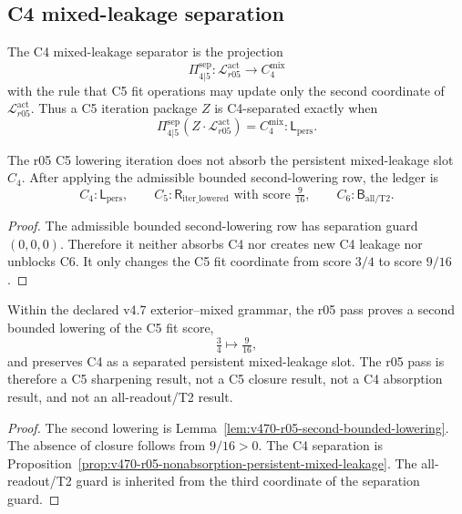 \subsection{C4 mixed-leakage separation}
\label{subsec:v470-r05-c4-mixed-leakage-separation}

\begin{definition}
\label{def:v470-r05-c4-leakage-separator}
The C4 mixed-leakage separator is the projection
\[
\Pi_{4|5}^{\mathrm{sep}}:
\mathcal L_{r05}^{\mathrm{act}}
\longrightarrow C_4^{\mathrm{mix}}
\]
with the rule that C5 fit operations may update only the second coordinate of
\(\mathcal L_{r05}^{\mathrm{act}}\).  Thus a C5 iteration package \(Z\) is
C4-separated exactly when
\[
\Pi_{4|5}^{\mathrm{sep}}(Z\cdot\mathcal L_{r05}^{\mathrm{act}})
=
C_4^{\mathrm{mix}}:\mathsf L_{\mathrm{pers}}.
\]
\end{definition}

\begin{proposition}
\label{prop:v470-r05-nonabsorption-persistent-mixed-leakage}
The r05 C5 lowering iteration does not absorb the persistent mixed-leakage slot
\(C_4\).  After applying the admissible bounded second-lowering row, the ledger
is
\[
C_4:\mathsf L_{\mathrm{pers}},
\qquad
C_5:\mathsf R_{\mathrm{iter\_lowered}}\text{ with score }\tfrac{9}{16},
\qquad
C_6:\mathsf B_{\mathrm{all/T2}}.
\]
\end{proposition}

\begin{proof}
The admissible bounded second-lowering row has separation guard \((0,0,0)\).
Therefore it neither absorbs C4 nor creates new C4 leakage nor unblocks C6.  It
only changes the C5 fit coordinate from score \(3/4\) to score \(9/16\).
\end{proof}

\begin{theorem}
\label{thm:v470-r05-conservative-c5-iteration-c4-separation}
Within the declared v4.7 exterior--mixed grammar, the r05 pass proves a second
bounded lowering of the C5 fit score,
\[
\tfrac34 \longmapsto \tfrac{9}{16},
\]
and preserves C4 as a separated persistent mixed-leakage slot.  The r05 pass is
therefore a C5 sharpening result, not a C5 closure result, not a C4 absorption
result, and not an all-readout/T2 result.
\end{theorem}

\begin{proof}
The second lowering is Lemma~\ref{lem:v470-r05-second-bounded-lowering}.  The
absence of closure follows from \(9/16>0\).  The C4 separation is
Proposition~\ref{prop:v470-r05-nonabsorption-persistent-mixed-leakage}.  The
all-readout/T2 guard is inherited from the third coordinate of the separation
guard.
\end{proof}

